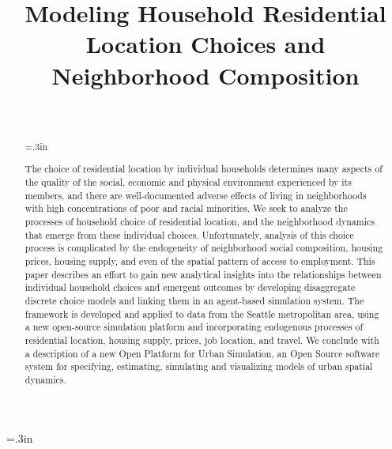 \documentclass[12pt,a4paper]{article}
\begin{document}
\title{Modeling Household Residential Location Choices and Neighborhood Composition}

\author{\\
}\maketitle


\baselineskip=.3in

\begin{abstract}
\baselineskip=.3in

The choice of residential location by individual households
determines many aspects of the quality of the social, economic and
physical environment experienced by its members, and there are
well-documented adverse effects of living in neighborhoods with
high concentrations of poor and racial minorities.  We seek to
analyze the processes of household choice of residential location,
and the neighborhood dynamics that emerge from these individual
choices.  Unfortunately, analysis of this choice process is
complicated by the endogeneity of neighborhood social composition,
housing prices, housing supply, and even of the spatial pattern of
access to employment. This paper describes an effort to gain new
analytical insights into the relationships between individual
household choices and emergent outcomes by developing disaggregate
discrete choice models and linking them in an agent-based
simulation system. The framework is developed and applied to data
from the Seattle metropolitan area, using a new open-source
simulation platform and incorporating endogenous processes of
residential location, housing supply, prices, job location, and
travel.  We conclude with a description of a new Open Platform
for Urban Simulation, an Open Source software system for specifying, 
estimating, simulating and visualizing models of urban spatial
dynamics.

\end{abstract}
\clearpage
\end{document}
